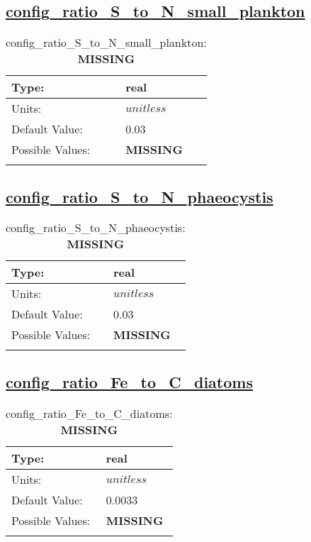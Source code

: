 \subsection[config\_ratio\_S\_to\_N\_small\_plankton]{\hyperref[sec:nm_tab_biogeochemistry]{config\_ratio\_S\_to\_N\_small\_plankton}}
\label{subsec:nm_sec_config_ratio_S_to_N_small_plankton}
\begin{center}
\begin{longtable}{| p{2.0in} || p{4.0in} |}
    \hline
    Type: & real \\
    \hline
    Units: & $unitless$ \\
    \hline
    Default Value: & 0.03 \\
    \hline
    Possible Values: & {\bf \color{red} MISSING} \\
    \hline
    \caption{config\_ratio\_S\_to\_N\_small\_plankton: {\bf \color{red} MISSING}}
\end{longtable}
\end{center}
\subsection[config\_ratio\_S\_to\_N\_phaeocystis]{\hyperref[sec:nm_tab_biogeochemistry]{config\_ratio\_S\_to\_N\_phaeocystis}}
\label{subsec:nm_sec_config_ratio_S_to_N_phaeocystis}
\begin{center}
\begin{longtable}{| p{2.0in} || p{4.0in} |}
    \hline
    Type: & real \\
    \hline
    Units: & $unitless$ \\
    \hline
    Default Value: & 0.03 \\
    \hline
    Possible Values: & {\bf \color{red} MISSING} \\
    \hline
    \caption{config\_ratio\_S\_to\_N\_phaeocystis: {\bf \color{red} MISSING}}
\end{longtable}
\end{center}
\subsection[config\_ratio\_Fe\_to\_C\_diatoms]{\hyperref[sec:nm_tab_biogeochemistry]{config\_ratio\_Fe\_to\_C\_diatoms}}
\label{subsec:nm_sec_config_ratio_Fe_to_C_diatoms}
\begin{center}
\begin{longtable}{| p{2.0in} || p{4.0in} |}
    \hline
    Type: & real \\
    \hline
    Units: & $unitless$ \\
    \hline
    Default Value: & 0.0033 \\
    \hline
    Possible Values: & {\bf \color{red} MISSING} \\
    \hline
    \caption{config\_ratio\_Fe\_to\_C\_diatoms: {\bf \color{red} MISSING}}
\end{longtable}
\end{center}
